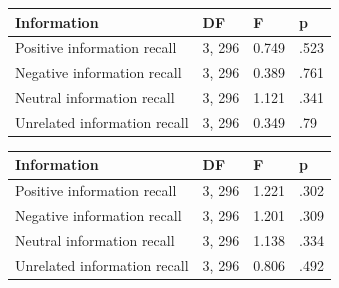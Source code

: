 \documentclass[
  man,
  longtable,
  nolmodern,
  notxfonts,
  notimes,
  colorlinks=true,linkcolor=blue,citecolor=blue,urlcolor=blue]{apa7}
\begin{document}
\begin{table}

{\caption{{ANOVA analysis for recognition memory
tasks.}{\label{tbl-anova-recog}}}
\vspace{-20pt}}

\begin{longtable}[]{@{}llll@{}}
\toprule\noalign{}
Information & DF & F & p \\
\midrule\noalign{}
\endhead
\bottomrule\noalign{}
\endlastfoot
Positive information recall & 3, 296 & 0.749 & .523 \\
Negative information recall & 3, 296 & 0.389 & .761 \\
Neutral information recall & 3, 296 & 1.121 & .341 \\
Unrelated information recall & 3, 296 & 0.349 & .79 \\
\end{longtable}

\end{table}

\begin{table}

{\caption{{ANOVA analysis for free recall memory
tasks.}{\label{tbl-anova-freerecall}}}
\vspace{-20pt}}

\begin{longtable}[]{@{}llll@{}}
\toprule\noalign{}
Information & DF & F & p \\
\midrule\noalign{}
\endhead
\bottomrule\noalign{}
\endlastfoot
Positive information recall & 3, 296 & 1.221 & .302 \\
Negative information recall & 3, 296 & 1.201 & .309 \\
Neutral information recall & 3, 296 & 1.138 & .334 \\
Unrelated information recall & 3, 296 & 0.806 & .492 \\
\end{longtable}

\end{table}
\end{document}
